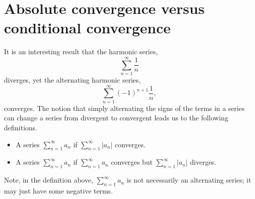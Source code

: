 \documentclass{ximera}
\begin{document}




\section{Absolute convergence versus conditional convergence}


It is an interesting result that the harmonic series,
\[
\sum_{n=1}^\infty \frac1n
\]
diverges, yet the alternating harmonic series,
\[
\sum_{n=1}^\infty (-1)^{n+1}\frac1n,
\]
converges. The notion that simply alternating the signs of the terms in a
series can change a series from divergent to convergent leads us to the following
definitions.

\begin{definition}\hfil
\begin{itemize}
\item A series $\sum_{n=1}^\infty a_n$  if $\sum_{n=1}^\infty |a_n|$ converges.
\item A series $\sum_{n=1}^\infty a_n$  if $\sum_{n=1}^\infty a_n$ converges but $\sum_{n=1}^\infty |a_n|$ diverges.
\end{itemize}
\end{definition}

Note, in the definition above, $\sum_{n=1}^\infty a_n$ is not
necessarily an alternating series; it may just have some negative
terms.
\end{document}

